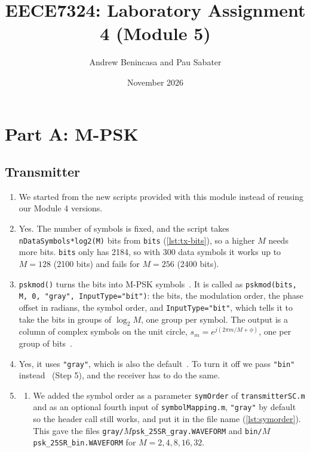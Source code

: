 \documentclass[11pt]{article}
\title{EECE7324: Laboratory Assignment 4 (Module 5)}
\author{Andrew Benincasa and Pau Sabater}
\date{November 2026}
\begin{document}
\maketitle

\section*{Part A: M-PSK}
\subsection*{Transmitter}
\begin{enumerate}
    \item We started from the new scripts provided with this module instead of reusing our Module 4 versions.

    \item Yes. The number of symbols is fixed, and the script takes \texttt{nDataSymbols*log2(M)} bits from \texttt{bits} (\cref{lst:tx-bits}), so a higher $M$ needs more bits. \texttt{bits} only has 2184, so with 300 data symbols it works up to $M = 128$ (2100 bits) and fails for $M = 256$ (2400 bits).



    \item \texttt{pskmod()} turns the bits into M-PSK symbols~\cite{pskmod}. It is called as \texttt{pskmod(bits, M, 0, "gray", InputType="bit")}: the bits, the modulation order, the phase offset in radians, the symbol order, and \texttt{InputType="bit"}, which tells it to take the bits in groups of $\log_2 M$, one group per symbol. The output is a column of complex symbols on the unit circle, $s_m = e^{j(2\pi m/M + \phi)}$, one per group of bits~\cite{pskmod}.

    \item Yes, it uses \texttt{"gray"}, which is also the default~\cite{pskmod}. To turn it off we pass \texttt{"bin"} instead~\cite{pskmod} (Step 5), and the receiver has to do the same.

    \item
    \begin{enumerate}[label=\alph*)]
        \item We added the symbol order as a parameter \texttt{symOrder} of \texttt{transmitterSC.m} and as an optional fourth input of \texttt{symbolMapping.m}, \texttt{"gray"} by default so the header call still works, and put it in the file name (\cref{lst:symorder}). This gave the files \texttt{gray/$M$psk\_25SR\_gray.WAVEFORM} and \texttt{bin/$M$psk\_25SR\_bin.WAVEFORM} for $M = 2, 4, 8, 16, 32$.


\end{enumerate}
\end{enumerate}
\end{document}
